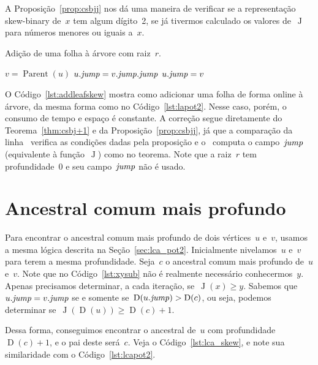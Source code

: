 \documentclass[main.tex]{subfiles}
\newcommand{\Par}{\operatorname{Parent}}
\newcommand{\Dep}{\operatorname{D}}
\newcommand{\J}{\operatorname{J}}
\begin{document}
A Proposição~\ref{prop:csbjj} nos dá uma maneira de verificar se a representação skew-binary de~$x$ tem algum dígito~2, se já tivermos calculado os valores de~$\J$ para números menores ou iguais a~$x$.

\renewcommand{\root}{\mathit{root}}
\begin{algorithm}[h]
\caption{Adição de uma folha à árvore com raiz~$r$.} \label{lst:addleafskew}
\begin{algorithmic}[1]
		\State $v = \Par(u)$
		\If{$v.\jmp \neq r \textbf{ and } \Dep(v) - \Dep(v.\jmp) = \Dep(v.\jmp) - \Dep(v.\jmp.\jmp)$} \label{lst:addleafskew:if}
			\State $u.\mathit{jump} = v.\mathit{jump}.\mathit{jump}$
		\Else
			\State $u.\mathit{jump} = v$
		\EndIf
	\EndFunction
\end{algorithmic}
\end{algorithm}

O Código~\ref{lst:addleafskew} mostra como adicionar uma folha de forma online à árvore, da mesma forma como no Código~\ref{lst:lapot2}. Nesse caso, porém, o consumo de tempo e espaço é constante. A correção segue diretamente do Teorema~\ref{thm:csbj+1} e da Proposição~\ref{prop:csbjj}, já que a comparação da linha~ verifica as condições dadas pela proposição e o~ computa o campo~$\mathit{jump}$ (equivalente à função~$\J$) como no teorema. Note que a raiz~$r$ tem profundidade~0 e seu campo~$\mathit{jump}$ não é usado.

\section{Ancestral comum mais profundo}

Para encontrar o ancestral comum mais profundo de dois vértices~$u$ e~$v$, usamos a mesma lógica descrita na Seção~\ref{sec:lca_pot2}. Inicialmente nivelamos~$u$ e~$v$ para terem a mesma profundidade. Seja~$c$ o ancestral comum mais profundo de~$u$ e~$v$. Note que no Código~\ref{lst:xysub} não é realmente necessário conhecermos~$y$. Apenas precisamos determinar, a cada iteração, se~$\J(x) \geq y$. Sabemos que~${u.\mathit{jump} = v.\mathit{jump}}$ se e somente se~${\Dep(u.\jmp) > \Dep(c)}$, ou seja, podemos determinar se~${\J(\Dep(u)) \geq \Dep(c) + 1}$.

Dessa forma, conseguimos encontrar o ancestral de~$u$ com profundidade~$\Dep(c) + 1$, e o pai deste será~$c$. Veja o Código~\ref{lst:lca_skew}, e note sua similaridade com o Código~\ref{lst:lcapot2}.
\end{document}
